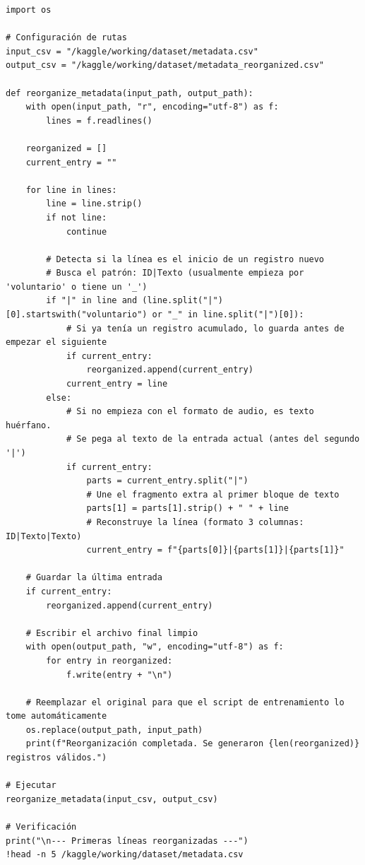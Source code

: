     \begin{verbatim}
import os

# Configuración de rutas
input_csv = "/kaggle/working/dataset/metadata.csv"
output_csv = "/kaggle/working/dataset/metadata_reorganized.csv"

def reorganize_metadata(input_path, output_path):
    with open(input_path, "r", encoding="utf-8") as f:
        lines = f.readlines()

    reorganized = []
    current_entry = ""

    for line in lines:
        line = line.strip()
        if not line:
            continue

        # Detecta si la línea es el inicio de un registro nuevo
        # Busca el patrón: ID|Texto (usualmente empieza por 'voluntario' o tiene un '_')
        if "|" in line and (line.split("|")[0].startswith("voluntario") or "_" in line.split("|")[0]):
            # Si ya tenía un registro acumulado, lo guarda antes de empezar el siguiente
            if current_entry:
                reorganized.append(current_entry)
            current_entry = line
        else:
            # Si no empieza con el formato de audio, es texto huérfano. 
            # Se pega al texto de la entrada actual (antes del segundo '|')
            if current_entry:
                parts = current_entry.split("|")
                # Une el fragmento extra al primer bloque de texto
                parts[1] = parts[1].strip() + " " + line
                # Reconstruye la línea (formato 3 columnas: ID|Texto|Texto)
                current_entry = f"{parts[0]}|{parts[1]}|{parts[1]}"

    # Guardar la última entrada
    if current_entry:
        reorganized.append(current_entry)

    # Escribir el archivo final limpio
    with open(output_path, "w", encoding="utf-8") as f:
        for entry in reorganized:
            f.write(entry + "\n")

    # Reemplazar el original para que el script de entrenamiento lo tome automáticamente
    os.replace(output_path, input_path)
    print(f"Reorganización completada. Se generaron {len(reorganized)} registros válidos.")

# Ejecutar
reorganize_metadata(input_csv, output_csv)

# Verificación
print("\n--- Primeras líneas reorganizadas ---")
!head -n 5 /kaggle/working/dataset/metadata.csv
    \end{verbatim}

